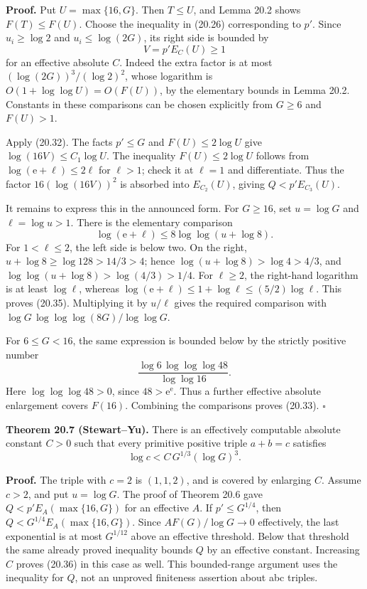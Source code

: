 \documentclass[
  11pt,
  a4paper,
]{article}
\begin{document}
\textbf{Proof.} Put \(U=\max\{16,G\}\). Then \(T\le U\), and Lemma 20.2
shows \(F(T)\le F(U)\). Choose the inequality in (20.26) corresponding
to \(p'\). Since \(u_i\ge\log2\) and \(u_i\le\log(2G)\), its right side
is bounded by \[
 V=p'E_C(U)\ge1
 \tag{20.34}
\] for an effective absolute \(C\). Indeed the extra factor is at most
\((\log(2G))^3/(\log2)^2\), whose logarithm is
\(O(1+\log\log U)=O(F(U))\), by the elementary bounds in Lemma 20.2.
Constants in these comparisons can be chosen explicitly from \(G\ge6\)
and \(F(U)>1\).

Apply (20.32). The facts \(p'\le G\) and \(F(U)\le2\log U\) give
\(\log(16V)\le C_1\log U\). The inequality \(F(U)\le2\log U\) follows
from \(\log(\mathrm e+\ell)\le2\ell\) for \(\ell>1\); check it at
\(\ell=1\) and differentiate. Thus the factor \(16(\log(16V))^2\) is
absorbed into \(E_{C_2}(U)\), giving \(Q<p'E_{C_3}(U)\).

It remains to express this in the announced form. For \(G\ge16\), set
\(u=\log G\) and \(\ell=\log u>1\). There is the elementary comparison
\[
 \log(\mathrm e+\ell)\le8\log\log(u+\log8).
 \tag{20.35}
\] For \(1<\ell\le2\), the left side is below two. On the right,
\(u+\log8\ge\log128>14/3>4\); hence \(\log(u+\log8)>\log4>4/3\), and
\(\log\log(u+\log8)>\log(4/3)>1/4\). For \(\ell\ge2\), the right-hand
logarithm is at least \(\log\ell\), whereas
\(\log(\mathrm e+\ell)\le1+\log\ell\le(5/2)\log\ell\). This proves
(20.35). Multiplying it by \(u/\ell\) gives the required comparison with
\(\log G\,\log\log\log(8G)/\log\log G\).

For \(6\le G<16\), the same expression is bounded below by the strictly
positive number \[
 \frac{\log6\,\log\log\log48}{\log\log16}.
 \] Here \(\log\log\log48>0\), since \(48>\mathrm e^{\mathrm e}\). Thus
a further effective absolute enlargement covers \(F(16)\). Combining the
comparisons proves (20.33). \(\square\)

\textbf{Theorem 20.7 (Stewart--Yu).} There is an effectively computable
absolute constant \(C>0\) such that every primitive positive triple
\(a+b=c\) satisfies \[
 \log c<C\,G^{1/3}(\log G)^3.
 \tag{20.36}
\]

\textbf{Proof.} The triple with \(c=2\) is \((1,1,2)\), and is covered
by enlarging \(C\). Assume \(c>2\), and put \(u=\log G\). The proof of
Theorem 20.6 gave \(Q<p'E_A(\max\{16,G\})\) for an effective \(A\). If
\(p'\le G^{1/4}\), then \(Q<G^{1/4}E_A(\max\{16,G\})\). Since
\(AF(G)/\log G\to0\) effectively, the last exponential is at most
\(G^{1/12}\) above an effective threshold. Below that threshold the same
already proved inequality bounds \(Q\) by an effective constant.
Increasing \(C\) proves (20.36) in this case as well. This bounded-range
argument uses the inequality for \(Q\), not an unproved finiteness
assertion about abc triples.
\end{document}
